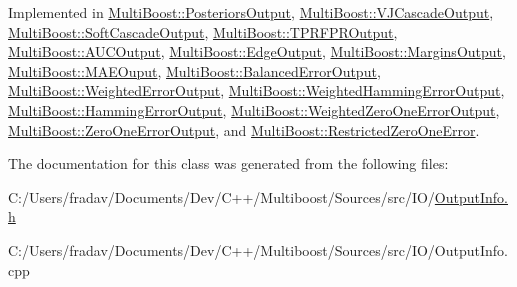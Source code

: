 Implemented in \hyperlink{classMultiBoost_1_1PosteriorsOutput_a5ee6d5fdf51f7fb3fbe4dc4ef2e7d6de}{Multi\-Boost\-::\-Posteriors\-Output}, \hyperlink{classMultiBoost_1_1VJCascadeOutput_a294c3882cdca5e62f52358d40c7ed156}{Multi\-Boost\-::\-V\-J\-Cascade\-Output}, \hyperlink{classMultiBoost_1_1SoftCascadeOutput_a6af5a3af1f5ecee45ded3db7ce982b41}{Multi\-Boost\-::\-Soft\-Cascade\-Output}, \hyperlink{classMultiBoost_1_1TPRFPROutput_a15b115b85bd48dfcf885b7c72242b46b}{Multi\-Boost\-::\-T\-P\-R\-F\-P\-R\-Output}, \hyperlink{classMultiBoost_1_1AUCOutput_aaad068a71360d488028ba2fec82eaa97}{Multi\-Boost\-::\-A\-U\-C\-Output}, \hyperlink{classMultiBoost_1_1EdgeOutput_abfdaafbb0ce5c69b82342ec1277e4e0c}{Multi\-Boost\-::\-Edge\-Output}, \hyperlink{classMultiBoost_1_1MarginsOutput_a657597f9a22c2628f8fb1110e1625a8c}{Multi\-Boost\-::\-Margins\-Output}, \hyperlink{classMultiBoost_1_1MAEOuput_aea5df1d89f3ea04e20c5b7c2b4604d72}{Multi\-Boost\-::\-M\-A\-E\-Ouput}, \hyperlink{classMultiBoost_1_1BalancedErrorOutput_a8a88ddc687b1d6f04a9720f54f249efa}{Multi\-Boost\-::\-Balanced\-Error\-Output}, \hyperlink{classMultiBoost_1_1WeightedErrorOutput_a389ffaa0bfa49309aca3d8fd9a0e819b}{Multi\-Boost\-::\-Weighted\-Error\-Output}, \hyperlink{classMultiBoost_1_1WeightedHammingErrorOutput_a0d0b87220af1d5db7a4422181eac7073}{Multi\-Boost\-::\-Weighted\-Hamming\-Error\-Output}, \hyperlink{classMultiBoost_1_1HammingErrorOutput_ae5cb9388a296ca15feedcf79ef002466}{Multi\-Boost\-::\-Hamming\-Error\-Output}, \hyperlink{classMultiBoost_1_1WeightedZeroOneErrorOutput_af3bb173deec1f443a8f1b8c9d709e269}{Multi\-Boost\-::\-Weighted\-Zero\-One\-Error\-Output}, \hyperlink{classMultiBoost_1_1ZeroOneErrorOutput_aec8b0221c76cccdd34e2b5905a8bf549}{Multi\-Boost\-::\-Zero\-One\-Error\-Output}, and \hyperlink{classMultiBoost_1_1RestrictedZeroOneError_a5b9ed19e09af40702ca62c79477cfc96}{Multi\-Boost\-::\-Restricted\-Zero\-One\-Error}.



The documentation for this class was generated from the following files\-:\begin{DoxyCompactItemize}
\item 
C\-:/\-Users/fradav/\-Documents/\-Dev/\-C++/\-Multiboost/\-Sources/src/\-I\-O/\hyperlink{OutputInfo_8h}{Output\-Info.\-h}\item 
C\-:/\-Users/fradav/\-Documents/\-Dev/\-C++/\-Multiboost/\-Sources/src/\-I\-O/Output\-Info.\-cpp\end{DoxyCompactItemize}
